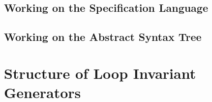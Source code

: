 \subsection{Working on the Specification Language}

\subsection{Working on the Abstract Syntax Tree}

\section{Structure of Loop Invariant Generators}
